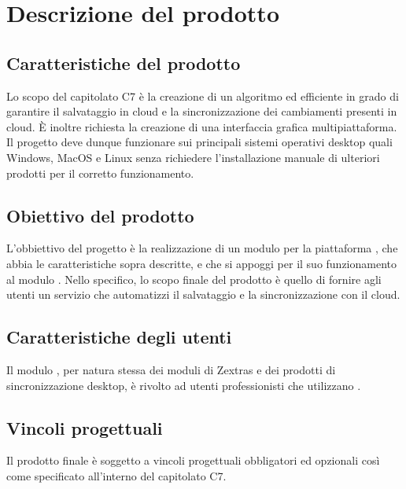 \section{Descrizione del prodotto}
\subsection{Caratteristiche del prodotto}
Lo scopo del capitolato C7 è la creazione di un algoritmo  ed efficiente in grado di garantire il salvataggio in cloud e la sincronizzazione dei cambiamenti presenti in cloud. È inoltre richiesta la creazione di una interfaccia grafica multipiattaforma. Il progetto deve dunque funzionare sui principali sistemi operativi desktop quali Windows, MacOS e Linux senza richiedere l'installazione manuale di ulteriori prodotti per il corretto funzionamento. 
\subsection{Obiettivo del prodotto}
L'obbiettivo del progetto è la realizzazione di un modulo per la piattaforma , che abbia le caratteristiche sopra descritte, e che si appoggi per il suo funzionamento al modulo .
Nello specifico, lo scopo finale del prodotto è quello di fornire agli utenti un servizio che automatizzi il salvataggio e la sincronizzazione con il cloud.
\subsection{Caratteristiche degli utenti}
Il modulo \progetto{}, per natura stessa dei moduli di Zextras e dei prodotti di sincronizzazione desktop, è rivolto ad utenti professionisti che utilizzano . 
\subsection{Vincoli progettuali}
Il prodotto  finale è soggetto a vincoli progettuali obbligatori ed opzionali così come specificato all'interno del capitolato C7.